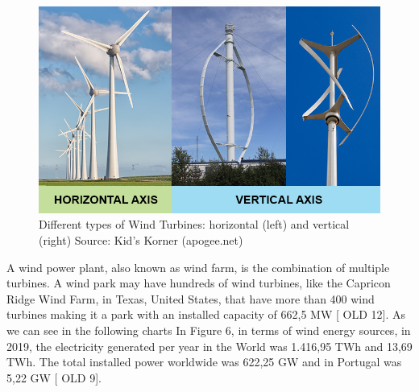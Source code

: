 \begin{figure}[]
	\centering
	\includegraphics[width=\textwidth]{Chapters/Figures/background_fig5.png}
	\caption{Different types of Wind Turbines: horizontal (left) and vertical (right) Source: Kid's Korner (apogee.net)}
	\label{fig:Figuras_Tree_silhouettes-vectorial}
\end{figure}



A wind power plant, also known as wind farm, is the combination of multiple turbines. A wind park may have hundreds of wind turbines, like the Capricon Ridge Wind Farm, in Texas, United States, that have more than 400 wind turbines making it a park with an installed capacity of 662,5 MW [ OLD 12].
As we can see in the following charts In Figure 6, in terms of wind energy sources, in 2019, the electricity generated per year in the World was 1.416,95 TWh and 13,69 TWh. The total installed power worldwide was 622,25 GW and in Portugal was 5,22 GW [ OLD 9].


